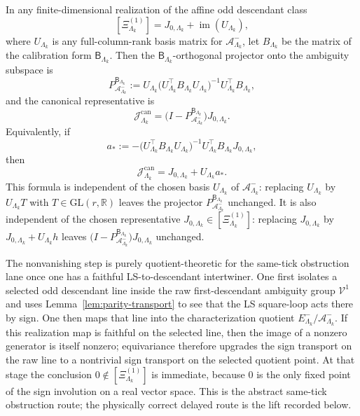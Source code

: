 \begin{remark}
\label{rem:Jcan-finite-dimensional-projector}
In any finite-dimensional realization of the affine odd descendant class
\[
[\Xi^{(1)}_{\Lambda_k}]
=
J_{0,\Lambda_k}+\operatorname{im}(U_{\Lambda_k}),
\]
where \(U_{\Lambda_k}\) is any full-column-rank basis matrix for
\(\mathcal A^-_{\Lambda_k}\), let \(B_{\Lambda_k}\) be the matrix of the
calibration form \(\mathsf B_{\Lambda_k}\).
Then the \(\mathsf B_{\Lambda_k}\)-orthogonal projector onto the ambiguity
subspace is
\[
P_{\mathcal A^-_{\Lambda_k}}^{\mathsf B_{\Lambda_k}}
:=
U_{\Lambda_k}
\bigl(U_{\Lambda_k}^{\top}B_{\Lambda_k}U_{\Lambda_k}\bigr)^{-1}
U_{\Lambda_k}^{\top}B_{\Lambda_k},
\]
and the canonical representative is
\[
\mathcal J^{\mathrm{can}}_{\Lambda_k}
=
\bigl(I-P_{\mathcal A^-_{\Lambda_k}}^{\mathsf B_{\Lambda_k}}\bigr)
J_{0,\Lambda_k}.
\]
Equivalently, if
\[
a_{\ast}
:=
-\bigl(U_{\Lambda_k}^{\top}B_{\Lambda_k}U_{\Lambda_k}\bigr)^{-1}
U_{\Lambda_k}^{\top}B_{\Lambda_k}J_{0,\Lambda_k},
\]
then
\[
\mathcal J^{\mathrm{can}}_{\Lambda_k}
=
J_{0,\Lambda_k}+U_{\Lambda_k}a_{\ast}.
\]
This formula is independent of the chosen basis \(U_{\Lambda_k}\) of
\(\mathcal A^-_{\Lambda_k}\): replacing \(U_{\Lambda_k}\) by
\(U_{\Lambda_k}T\) with \(T\in \mathrm{GL}(r,\mathbb R)\) leaves the projector
\(P_{\mathcal A^-_{\Lambda_k}}^{\mathsf B_{\Lambda_k}}\) unchanged.
It is also independent of the chosen representative
\(J_{0,\Lambda_k}\in[\Xi^{(1)}_{\Lambda_k}]\): replacing \(J_{0,\Lambda_k}\)
by \(J_{0,\Lambda_k}+U_{\Lambda_k}h\) leaves
\(
\bigl(I-P_{\mathcal A^-_{\Lambda_k}}^{\mathsf B_{\Lambda_k}}\bigr)
J_{0,\Lambda_k}
\)
unchanged.
\end{remark}

\begin{remark}
\label{rem:Main-nonvanishing-strategy}
The nonvanishing step is purely quotient-theoretic for the same-tick obstruction lane once one has a
faithful LS-to-descendant intertwiner.
One first isolates a selected odd descendant line inside the raw first-descendant
ambiguity group \(\mathcal V^1\) and uses Lemma~\ref{lem:parity-transport} to
see that the LS square-loop acts there by sign.
One then maps that line into the characterization quotient
\(E^-_{\Lambda_k}/\mathcal A^-_{\Lambda_k}\).
If this realization map is faithful on the selected line, then the image of a
nonzero generator is itself nonzero; equivariance therefore upgrades the sign
transport on the raw line to a nontrivial sign transport on the selected quotient
point.
At that stage the conclusion \(0\notin[\Xi^{(1)}_{\Lambda_k}]\) is immediate,
because \(0\) is the only fixed point of the sign involution on a real vector
space. This is the abstract same-tick obstruction route; the physically correct
delayed route is the lift recorded below.
\end{remark}

